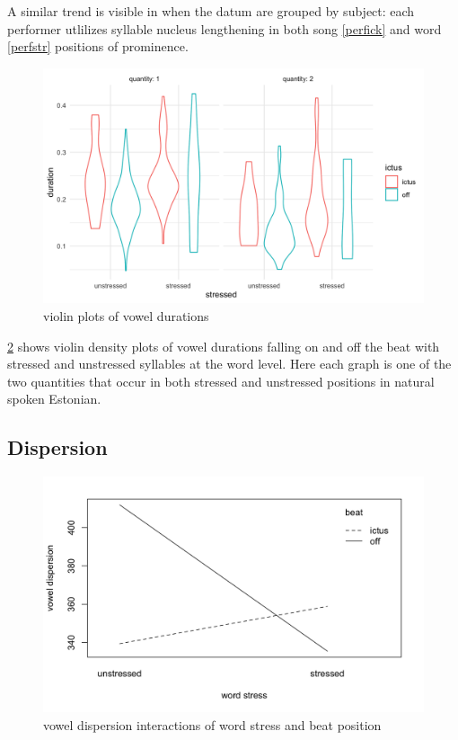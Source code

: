 A similar trend is visible in  when the datum are grouped by subject: each performer utlilizes syllable nucleus lengthening in both song \ref{perfick} and word \ref{perfstr} positions of prominence. 

\begin{figure}[htb]
\begin{center}
\includegraphics[width=\textwidth]{figures/dur_density_qfac.png}


\caption{violin plots of vowel durations}
\label{density}
\end{center}
\end{figure}

\ref{density} shows violin density plots of vowel durations falling on and off the beat with stressed and unstressed syllables at the word level. Here each graph is one of the two quantities that occur in both stressed and unstressed positions in natural spoken Estonian. 
\subsection{Dispersion}
\begin{figure}[htb]
\begin{center}
\includegraphics[width=\textwidth]{figures/interact_space_strictus.png}


\caption{vowel dispersion interactions of word stress and beat position}
\label{density}
\end{center}
\end{figure}

